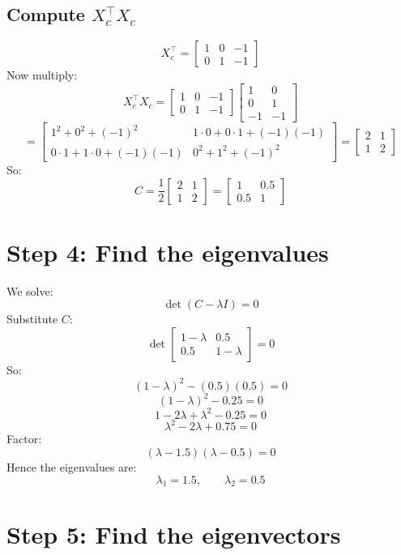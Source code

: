 \documentclass[11pt]{article}
\begin{document}
\subsection{Compute $X_c^\top X_c$}
\[
  X_c^\top =
  \begin{bmatrix}
    1 & 0 & -1\\
    0 & 1 & -1
  \end{bmatrix}
\]
Now multiply:
\[
  X_c^\top X_c =
  \begin{bmatrix}
    1 & 0 & -1\\
    0 & 1 & -1
  \end{bmatrix}
  \begin{bmatrix}
    1 & 0\\
    0 & 1\\
    -1 & -1
  \end{bmatrix}
\]
\[
  =
  \begin{bmatrix}
    1^2 + 0^2 + (-1)^2 & 1\cdot 0 + 0\cdot 1 + (-1)(-1)\\
    0\cdot 1 + 1\cdot 0 + (-1)(-1) & 0^2 + 1^2 + (-1)^2
  \end{bmatrix}
  =
  \begin{bmatrix}
    2 & 1\\
    1 & 2
  \end{bmatrix}
\]
So:
\[
  C =
  \frac{1}{2}
  \begin{bmatrix}
    2 & 1\\
    1 & 2
  \end{bmatrix}
  =
  \begin{bmatrix}
    1 & 0.5\\
    0.5 & 1
  \end{bmatrix}
\]

\section{Step 4: Find the eigenvalues}
We solve:
\[
  \det(C - \lambda I)=0
\]
Substitute $C$:
\[
  \det
  \begin{bmatrix}
    1-\lambda & 0.5\\
    0.5 & 1-\lambda
  \end{bmatrix}
  = 0
\]
So:
\[
  (1-\lambda)^2 - (0.5)(0.5) = 0
\]
\[
  (1-\lambda)^2 - 0.25 = 0
\]
\[
  1 - 2\lambda + \lambda^2 - 0.25 = 0
\]
\[
  \lambda^2 - 2\lambda + 0.75 = 0
\]
Factor:
\[
  (\lambda - 1.5)(\lambda - 0.5)=0
\]
Hence the eigenvalues are:
\[
  \lambda_1 = 1.5,
  \qquad
  \lambda_2 = 0.5
\]

\section{Step 5: Find the eigenvectors}
\end{document}
